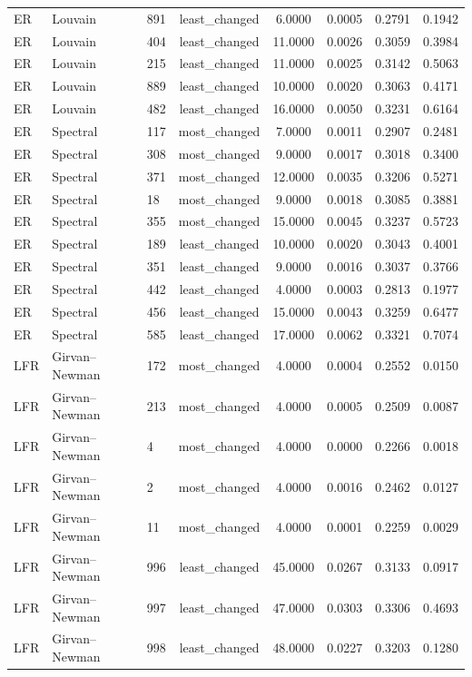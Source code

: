 \begin{longtable}{lllccccc}
ER & Louvain & 891 & least\_changed & 6.0000 & 0.0005 & 0.2791 & 0.1942 \\
ER & Louvain & 404 & least\_changed & 11.0000 & 0.0026 & 0.3059 & 0.3984 \\
ER & Louvain & 215 & least\_changed & 11.0000 & 0.0025 & 0.3142 & 0.5063 \\
ER & Louvain & 889 & least\_changed & 10.0000 & 0.0020 & 0.3063 & 0.4171 \\
ER & Louvain & 482 & least\_changed & 16.0000 & 0.0050 & 0.3231 & 0.6164 \\
ER & Spectral & 117 & most\_changed & 7.0000 & 0.0011 & 0.2907 & 0.2481 \\
ER & Spectral & 308 & most\_changed & 9.0000 & 0.0017 & 0.3018 & 0.3400 \\
ER & Spectral & 371 & most\_changed & 12.0000 & 0.0035 & 0.3206 & 0.5271 \\
ER & Spectral & 18 & most\_changed & 9.0000 & 0.0018 & 0.3085 & 0.3881 \\
ER & Spectral & 355 & most\_changed & 15.0000 & 0.0045 & 0.3237 & 0.5723 \\
ER & Spectral & 189 & least\_changed & 10.0000 & 0.0020 & 0.3043 & 0.4001 \\
ER & Spectral & 351 & least\_changed & 9.0000 & 0.0016 & 0.3037 & 0.3766 \\
ER & Spectral & 442 & least\_changed & 4.0000 & 0.0003 & 0.2813 & 0.1977 \\
ER & Spectral & 456 & least\_changed & 15.0000 & 0.0043 & 0.3259 & 0.6477 \\
ER & Spectral & 585 & least\_changed & 17.0000 & 0.0062 & 0.3321 & 0.7074 \\
LFR & Girvan--Newman & 172 & most\_changed & 4.0000 & 0.0004 & 0.2552 & 0.0150 \\
LFR & Girvan--Newman & 213 & most\_changed & 4.0000 & 0.0005 & 0.2509 & 0.0087 \\
LFR & Girvan--Newman & 4 & most\_changed & 4.0000 & 0.0000 & 0.2266 & 0.0018 \\
LFR & Girvan--Newman & 2 & most\_changed & 4.0000 & 0.0016 & 0.2462 & 0.0127 \\
LFR & Girvan--Newman & 11 & most\_changed & 4.0000 & 0.0001 & 0.2259 & 0.0029 \\
LFR & Girvan--Newman & 996 & least\_changed & 45.0000 & 0.0267 & 0.3133 & 0.0917 \\
LFR & Girvan--Newman & 997 & least\_changed & 47.0000 & 0.0303 & 0.3306 & 0.4693 \\
LFR & Girvan--Newman & 998 & least\_changed & 48.0000 & 0.0227 & 0.3203 & 0.1280 \\

\end{longtable}

